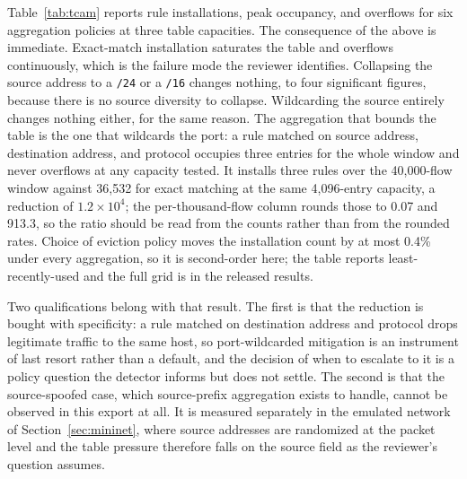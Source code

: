 \documentclass{ieeeaccess}
\begin{document}
Table~\ref{tab:tcam} reports rule installations, peak occupancy, and overflows
for six aggregation policies at three table capacities. The consequence of the
above is immediate. Exact-match installation saturates the table and overflows
continuously, which is the failure mode the reviewer identifies. Collapsing the
source address to a \texttt{/24} or a \texttt{/16} changes nothing, to four
significant figures, because there is no source diversity to collapse.
Wildcarding the source entirely changes nothing either, for the same reason. The
aggregation that bounds the table is the one that wildcards the port: a rule
matched on source address, destination address, and protocol occupies three
entries for the whole window and never overflows at any capacity tested. It
installs three rules over the 40,000-flow window against 36,532 for exact
matching at the same 4,096-entry capacity, a reduction of $1.2\times10^{4}$; the
per-thousand-flow column rounds those to 0.07 and 913.3, so the ratio should be
read from the counts rather than from the rounded rates. Choice of eviction
policy moves the installation count by at most 0.4\% under every aggregation, so
it is second-order here; the table reports least-recently-used and the full grid
is in the released results.

Two qualifications belong with that result. The first is that the reduction is
bought with specificity: a rule matched on destination address and protocol
drops legitimate traffic to the same host, so port-wildcarded mitigation is an
instrument of last resort rather than a default, and the decision of when to
escalate to it is a policy question the detector informs but does not settle.
The second is that the source-spoofed case, which source-prefix aggregation
exists to handle, cannot be observed in this export at all. It is measured
separately in the emulated network of Section~\ref{sec:mininet}, where source
addresses are randomized at the packet level and the table pressure therefore
falls on the source field as the reviewer's question assumes.
\end{document}
